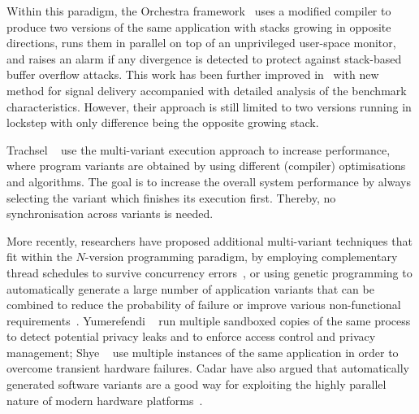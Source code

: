 
Within this paradigm, the Orchestra framework~\cite{orchestra09} uses a
modified compiler to produce two versions of the same application with stacks
growing in opposite directions, runs them in parallel on top of an unprivileged
user-space monitor, and raises an alarm if any divergence is detected to
protect against stack-based buffer overflow attacks.  This work has been
further improved in~\cite{orchestra11} with new method for signal delivery
accompanied with detailed analysis of the benchmark characteristics. However,
their approach is still limited to two versions running in lockstep with only
difference being the opposite growing stack.

Trachsel \etal~\cite{trachsel10} use the multi-variant execution approach to
increase performance, where program variants are obtained by using different
(compiler) optimisations and algorithms.  The goal is to increase the overall
system performance by always selecting the variant which finishes its execution
first. Thereby, no synchronisation across variants is needed.

More recently, researchers have proposed additional multi-variant techniques
that fit within the $N$-version programming paradigm, \eg by employing
complementary thread schedules to survive concurrency
errors~\cite{compl-schedules11}, or using genetic programming to automatically
generate a large number of application variants that can be combined to reduce
the probability of failure or improve various non-functional
requirements~\cite{gismoe}. Yumerefendi \etal~\cite{tightlip} run multiple
sandboxed copies of the same process to detect potential privacy leaks and to
enforce access control and privacy management; Shye \etal~\cite{shye2009} use
multiple instances of the same application in order to overcome transient
hardware failures. Cadar \etal have also argued that automatically generated
software variants are a good way for exploiting the highly parallel nature of
modern hardware platforms~\cite{multiplicity}.



